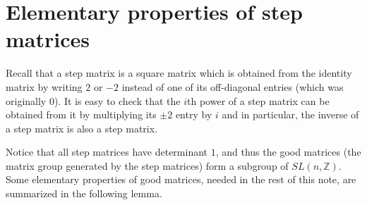 \documentclass{article}
\newtheorem{lemma}[theorem]{Lemma}
\theoremstyle{definition}
\newcommand{\R}{\mathbb R}
\newcommand{\Z}{\mathbb Z}
\begin{document}
\section{Elementary properties of step matrices}\label{sec3}

Recall that a step matrix is a square matrix which is obtained from the identity matrix by writing $2$ or $-2$ instead of one of its off-diagonal entries (which was originally $0$). It is easy to check that the $i$\/th power of a step matrix can be obtained from it by multiplying its $\pm2$ entry by $i$ and in particular, the inverse of a step matrix is also a step matrix.

Notice that all step matrices have determinant $1$, and thus the good matrices (the matrix group generated by the step matrices) form a subgroup of $SL(n,\Z)$. Some elementary properties of good matrices, needed in the rest of this note, are summarized in the following lemma.

\end{document}
